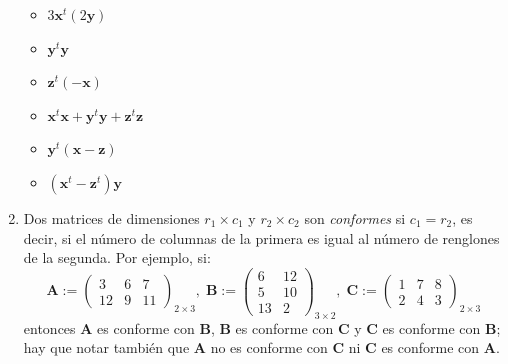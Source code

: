 \documentclass[8pt,a4paper]{article}
\begin{document}
\begin{enumerate}
	\begin{multicols}{2}
		\begin{itemize}
			\item $\displaystyle 3\mathbf{x}^t\left(2\mathbf{y}\right)$
			\item $\displaystyle \mathbf{y}^t\mathbf{y}$
			\item $\displaystyle \mathbf{z}^t\left(-\mathbf{x}\right)$
			\item $\displaystyle \mathbf{x}^t\mathbf{x}+\mathbf{y}^t\mathbf{y}+\mathbf{z}^t\mathbf{z}$
			\item $\displaystyle \mathbf{y}^t\left(\mathbf{x}-\mathbf{z}\right)$
			\item $\displaystyle \left(\mathbf{x}^t-\mathbf{z}^t\right)\mathbf{y}$
		\end{itemize}
	\end{multicols}
	
		\item Dos matrices de dimensiones $r_1\times c_1$ y $r_2\times c_2$ son \textit{conformes} si $c_1=r_2$, es decir, si el número de columnas de la primera es igual al número de renglones de la segunda. Por ejemplo, si:
%
		\[	\mathbf{A}:=
			\begin{pmatrix}
				3 & 6 & 7 \\
				12 & 9 & 11
			\end{pmatrix}_{2\times 3},\;
			\mathbf{B}:=
			\begin{pmatrix}
				6 & 12 \\
				5 & 10 \\
				13 & 2
			\end{pmatrix}_{3\times 2},\;
			\mathbf{C}:=
			\begin{pmatrix}
				1 & 7 & 8 \\
				2 & 4 & 3
			\end{pmatrix}_{2\times 3}
		\]
%
entonces $\mathbf{A}$ es conforme con $\mathbf{B}$, $\mathbf{B}$ es conforme con $\mathbf{C}$ y $\mathbf{C}$ es conforme con $\mathbf{B}$; hay que notar también que $\mathbf{A}$ no es conforme con $\mathbf{C}$ ni $\mathbf{C}$ es conforme con $\mathbf{A}$.


\end{enumerate}
\end{document}

